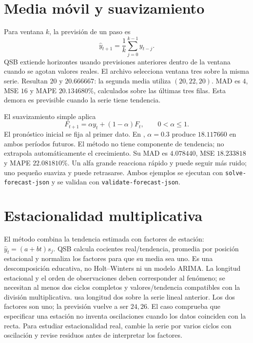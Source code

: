 \section{Media móvil y suavizamiento}
Para ventana \(k\), la previsión de un paso es
\[
 \hat y_{t+1}=\frac1k\sum_{j=0}^{k-1}y_{t-j}.
\]
QSB extiende horizontes usando previsiones anteriores dentro de la ventana
cuando se agotan valores reales. El archivo 
selecciona ventana tres sobre la misma serie. Resultan \(20\) y
\(20.666667\): la segunda media utiliza \((20,22,20)\). MAD es \(4\), MSE
\(16\) y MAPE \(20.134680\%\), calculados sobre las últimas tres filas.
Esta demora es previsible cuando la serie tiene tendencia.

El suavizamiento simple aplica
\[
 F_{t+1}=\alpha y_t+(1-\alpha)F_t,\qquad 0<\alpha\le1.
\]
El pronóstico inicial se fija al primer dato. En
, \(\alpha=0.3\) produce \(18.117660\) en
ambos períodos futuros. El método no tiene componente de tendencia; no
extrapola automáticamente el crecimiento. Su MAD es \(4.078440\), MSE
\(18.233818\) y MAPE \(22.081810\%\). Un alfa grande reacciona rápido y
puede seguir más ruido; uno pequeño suaviza y puede retrasarse.
Ambos ejemplos se ejecutan con \texttt{solve-forecast-json} y se validan con
\texttt{validate-forecast-json}.

\section{Estacionalidad multiplicativa}
El método combina la tendencia estimada con factores de estación:
\(\hat y_t=(a+bt)s_j\). QSB calcula cocientes real/tendencia, promedia por
posición estacional y normaliza los factores para que su media sea uno.
Es una descomposición educativa, no Holt--Winters ni un modelo ARIMA. La
longitud estacional y el orden de observaciones deben corresponder al fenómeno;
se necesitan al menos dos ciclos completos y valores/tendencia compatibles con
la división multiplicativa.
 usa longitud dos sobre la serie lineal anterior.
Los dos factores son uno; la previsión vuelve a ser \(24,26\). El caso
comprueba que especificar una estación no inventa oscilaciones cuando los datos
coinciden con la recta. Para estudiar estacionalidad real, cambie la serie por
varios ciclos con oscilación y revise residuos antes de interpretar los factores.


